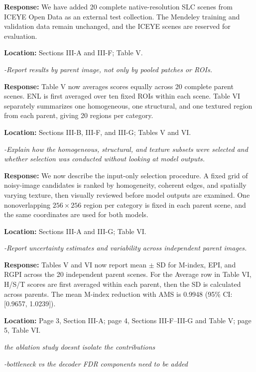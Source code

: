 \documentclass[11pt,letterpaper]{article}
\newcommand{\reviewgroup}[1]{%
  \Needspace{5\baselineskip}%
  \medskip\textit{#1}\par
}
\begin{document}
\textbf{Response:} We have added 20 complete native-resolution SLC scenes from ICEYE Open Data as an external test collection. The Mendeley training and validation data remain unchanged, and the ICEYE scenes are reserved for evaluation.

\textbf{Location:} Sections III-A and III-F; Table V.

\textit{-Report results by parent image, not only by pooled patches or ROIs.}

\textbf{Response:} Table V now averages scores equally across 20 complete parent scenes. ENL is first averaged over ten fixed ROIs within each scene. Table VI separately summarizes one homogeneous, one structural, and one textured region from each parent, giving 20 regions per category.

\textbf{Location:} Sections III-B, III-F, and III-G; Tables V and VI.

\textit{-Explain how the homogeneous, structural, and texture subsets were selected and whether selection was conducted without looking at model outputs.}

\textbf{Response:} We now describe the input-only selection procedure. A fixed grid of noisy-image candidates is ranked by homogeneity, coherent edges, and spatially varying texture, then visually reviewed before model outputs are examined. One nonoverlapping \(256\times256\) region per category is fixed in each parent scene, and the same coordinates are used for both models.

\textbf{Location:} Sections III-A and III-G; Table VI.

\textit{-Report uncertainty estimates and variability across independent parent images.}

\textbf{Response:} Tables V and VI now report mean $\pm$ SD for M-index, EPI, and RGPI across the 20 independent parent scenes. For the Average row in Table VI, H/S/T scores are first averaged within each parent, then the SD is calculated across parents. The mean M-index reduction with AMS is 0.9948 (95\% CI: [0.9657, 1.0239]).

\textbf{Location:} Page 3, Section III-A; page 4, Sections III-F--III-G and Table V; page 5, Table VI.

\reviewgroup{the ablation study doesn\textquotesingle{}t isolate the contributions}

\textit{-bottleneck vs the decoder FDR components need to be added}
\end{document}
